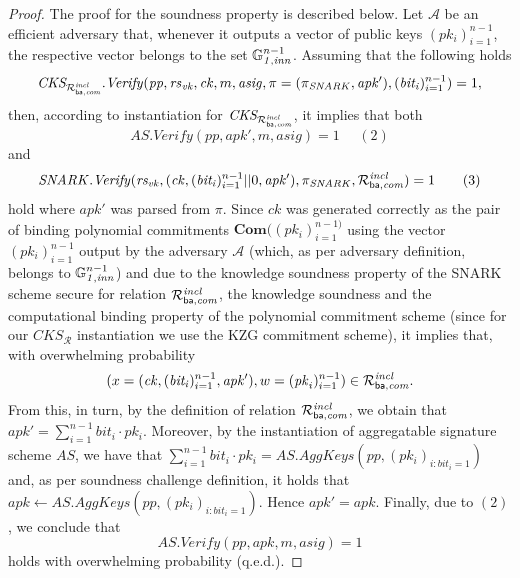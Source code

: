 \begin{proof}
\noindent The proof for the soundness property is described below. Let $\mathcal{A}$ be an efficient adversary that, 
whenever it outputs a vector of public keys $(\mathit{pk_i})_{i=1}^{n-1}$, the respective vector belongs to the set $\mathbb{G}_{\mathit{1,inn}}^{n-1}$. 
Assuming that the following holds 
$$\mathit{CKS_{\mathcal{R}^{\mathit{incl}}_{\mathsf{ba},\mathit{com}}}.Verify}(\mathit{pp}, \mathit{rs}_{\mathit{vk}}, \mathit{ck}, m, \mathit{asig}, \pi = (\pi_{\mathit{SNARK}}, \mathit{apk'}), (\mathit{bit_i})_{i=1}^{n-1}) =1,$$ 
then, according to instantiation for $\mathit{CKS_{\mathcal{R}^{\mathit{incl}}_{\mathsf{ba},\mathit{com}}}}$, it implies that both 
$$\mathit{AS.Verify(\mathit{pp}, \mathit{apk'}, m, \mathit{asig})} = 1 \ \ \ \ \ \ (2)$$ 
and 
$$\mathit{SNARK.Verify}(\mathit{rs_{vk}}, (\mathit{ck}, (\mathit{bit_i})_{i=1}^{n-1}||0, \mathit{apk'}), \pi_{\mathit{SNARK}}, \mathcal{R}^{\mathit{incl}}_{\mathsf{ba},\mathit{com}}) = 1  \ \ \ \ \ \ (3)$$
hold where $\mathit{apk'}$ was parsed from $\pi$. Since $\mathit{ck}$ was generated correctly as the pair of binding polynomial commitments 
$\mathbf{Com}((\mathit{pk_i})_{i=1}^{n-1)}$ using the vector $(\mathit{pk_i})_{i=1}^{n-1}$ output by the adversary $\mathcal{A}$ 
(which, as per adversary definition, belongs to $\mathbb{G}_{\mathit{1,inn}}^{n-1}$) and due to the knowledge 
soundness property of the SNARK scheme secure for relation $\mathcal{R}^{\mathit{incl}}_{\mathsf{ba},\mathit{com}}$, the knowledge soundness and the computational binding property 
of the polynomial commitment scheme (since for our $\mathit{CKS_{\mathcal{R}}}$ instantiation we use the KZG commitment scheme), it implies that, 
with overwhelming probability $$(x = (\mathit{ck}, (\mathit{bit_i})_{i=1}^{n-1}, \mathit{apk'}), w = (\mathit{pk}_i)_{i=1}^{n-1}) \in \mathcal{R}^{\mathit{incl}}_{\mathsf{ba},\mathit{com}}.$$ 
From this, in turn, by the definition of relation $\mathcal{R}^{\mathit{incl}}_{\mathsf{ba},\mathit{com}}$, we obtain that 
$\mathit{apk'} = \sum_{i=1}^{n-1} \mathit{bit_i} \cdot \mathit{pk_i}$. Moreover, by the instantiation of aggregatable signature scheme 
$\mathit{AS}$, we have that $\sum_{i=1}^{n-1} \mathit{bit_i} \cdot \mathit{pk_i} = \mathit{AS.AggKeys}(\mathit{pp}, (\mathit{pk_i})_{i:\mathit{bit_i = 1}})$ 
and, as per soundness challenge definition, it holds that \\
$\mathit{apk} \leftarrow \mathit{AS.AggKeys}(\mathit{pp}, (\mathit{pk_i})_{i:\mathit{bit_i = 1}})$. Hence $\mathit{apk'} = \mathit{apk}$.
Finally, due to $(2)$, we conclude that $$\mathit{AS.Verify(\mathit{pp}, \mathit{apk}, m, \mathit{asig})} = 1$$ holds with overwhelming probability (q.e.d.).

\end{proof}